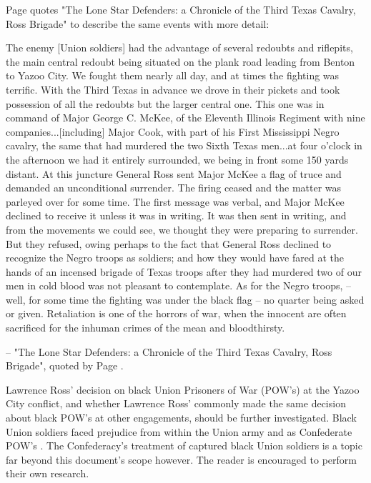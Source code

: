 \documentclass[12pt]{article}
\begin{document}
Page quotes "The Lone Star Defenders: a Chronicle of the Third Texas Cavalry, Ross Brigade" to describe the same events with more detail:
\begin{displayquote}
The enemy [Union soldiers] had the advantage of several redoubts and riflepits, the main central redoubt being situated on the plank road leading from Benton to Yazoo City.  We fought them nearly all day, and at times the fighting was terrific.  With the Third Texas in advance we drove in their pickets and took possession of all the redoubts but the larger central one.  This one was in command of Major George C. McKee, of the Eleventh Illinois Regiment with nine companies...[including] Major Cook, with part of his First Mississippi Negro cavalry, the same that had murdered the two Sixth Texas men...at four o'clock in the afternoon we had it entirely surrounded, we being in front some 150 yards distant. At this juncture General Ross sent Major McKee a flag of truce and demanded an unconditional surrender. The firing ceased and the matter was parleyed over for some time. The first message was verbal, and Major McKee declined to receive it unless it was in writing. It was then sent in writing, and from the movements we could see, we thought they were preparing to surrender. But they refused, owing perhaps to the fact that General Ross declined to recognize the Negro troops as soldiers; and how they would have fared at the hands of an incensed brigade of Texas troops after they had murdered two of our men in cold blood was not pleasant to contemplate. As for the Negro troops, -- well, for some time the fighting was under the black flag -- no quarter being asked or given.  Retaliation is one of the horrors of war, when the innocent are often sacrificed for the inhuman crimes of the mean and bloodthirsty.

-- "The Lone Star Defenders: a Chronicle of the Third Texas Cavalry, Ross Brigade", quoted by Page \cite[pg. 61--62]{page}.
\end{displayquote}

Lawrence Ross' decision on black Union Prisoners of War (POW's) at the Yazoo City conflict, and whether Lawrence Ross' commonly made the same decision about black POW's at other engagements, should be further investigated. Black Union soldiers faced prejudice from within the Union army and as Confederate POW's \cite{natarch:pow}. The Confederacy's treatment of captured black Union soldiers is a topic far beyond this document's scope however. The reader is encouraged to perform their own research. 
\end{document}
